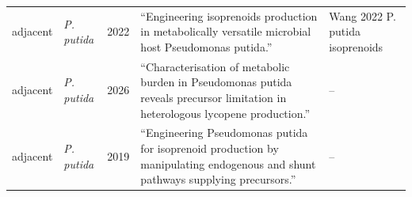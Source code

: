 \begin{landscape}
\begin{longtable}{@{}L{12mm} L{13mm} r L{104mm} L{38mm}@{}}
adjacent & \emph{P. putida} & 2022 & ``Engineering isoprenoids production in metabolically versatile microbial host Pseudomonas putida.'' & Wang 2022 P. putida isoprenoids \\
adjacent & \emph{P. putida} & 2026 & ``Characterisation of metabolic burden in Pseudomonas putida reveals precursor limitation in heterologous lycopene production.'' & -- \\
adjacent & \emph{P. putida} & 2019 & ``Engineering Pseudomonas putida for isoprenoid production by manipulating endogenous and shunt pathways supplying precursors.'' & -- \\
\end{longtable}
\endgroup
\end{landscape}
